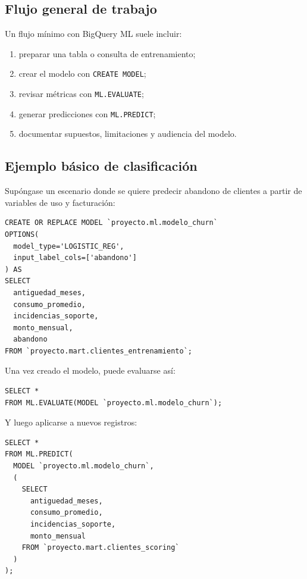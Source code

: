 \documentclass[12pt]{article}
\begin{document}
\subsection{Flujo general de trabajo}
Un flujo mínimo con BigQuery ML suele incluir:

\begin{enumerate}[label=\textbf{M\arabic*.}, leftmargin=*]
\item preparar una tabla o consulta de entrenamiento;
\item crear el modelo con \texttt{CREATE MODEL};
\item revisar métricas con \texttt{ML.EVALUATE};
\item generar predicciones con \texttt{ML.PREDICT};
\item documentar supuestos, limitaciones y audiencia del modelo.
\end{enumerate}

\subsection{Ejemplo básico de clasificación}
Supóngase un escenario donde se quiere predecir abandono de clientes a partir de variables de uso y facturación:

\begin{lstlisting}[style=sql, caption={Creación de un modelo de regresión logística}]
CREATE OR REPLACE MODEL `proyecto.ml.modelo_churn`
OPTIONS(
  model_type='LOGISTIC_REG',
  input_label_cols=['abandono']
) AS
SELECT
  antiguedad_meses,
  consumo_promedio,
  incidencias_soporte,
  monto_mensual,
  abandono
FROM `proyecto.mart.clientes_entrenamiento`;
\end{lstlisting}

Una vez creado el modelo, puede evaluarse así:

\begin{lstlisting}[style=sql, caption={Evaluación del modelo}]
SELECT *
FROM ML.EVALUATE(MODEL `proyecto.ml.modelo_churn`);
\end{lstlisting}

Y luego aplicarse a nuevos registros:

\begin{lstlisting}[style=sql, caption={Predicción sobre nuevos clientes}]
SELECT *
FROM ML.PREDICT(
  MODEL `proyecto.ml.modelo_churn`,
  (
    SELECT
      antiguedad_meses,
      consumo_promedio,
      incidencias_soporte,
      monto_mensual
    FROM `proyecto.mart.clientes_scoring`
  )
);
\end{lstlisting}
\end{document}
